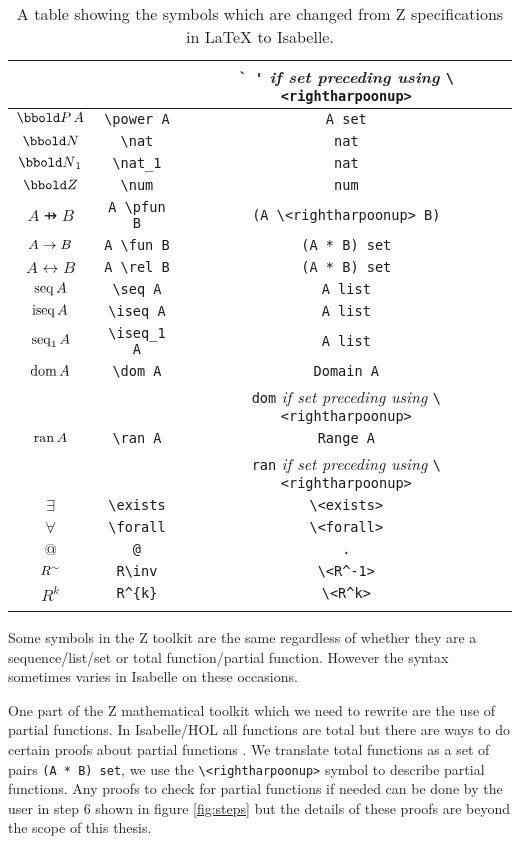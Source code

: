 {\begin{longtable}[H]{|c | c | c |}
& & \verb|` '| \textit{if set preceding using} \verb|\<rightharpoonup>| \\
\hline
$\power A$ & \verb|\power A| & \verb|A set| \\
\hline
$\nat$ & \verb|\nat| & \verb|nat| \\
\hline
$\nat_1$ & \verb|\nat_1| & \verb|nat| \\
\hline
$\num$ & \verb|\num| & \verb|num| \\
\hline
$A \pfun B$ & \verb|A \pfun B| & \verb|(A \<rightharpoonup> B)| \\
\hline
$A \rightarrow B$ & \verb|A \fun B| & \verb|(A * B) set| \\
\hline
$A \rel B$ & \verb|A \rel B| & \verb|(A * B) set| \\
\hline
$\mathop{\mathrm{seq}} A$ & \verb|\seq A| & \verb|A list| \\
\hline
$\mathop{\mathrm{iseq}} A$ & \verb|\iseq A| & \verb|A list| \\
\hline
$\mathop{\mathrm{seq}}_1 A$ & \verb|\iseq_1 A| & \verb|A list| \\
\hline
$\mathop{\mathrm{dom}} A$ & \verb|\dom A| & \verb|Domain A| \\
& & \verb|dom| \textit{if set preceding using} \verb|\<rightharpoonup>| \\
\hline
$\mathop{\mathrm{ran}} A$ & \verb|\ran A| & \verb|Range A| \\
& & \verb|ran| \textit{if set preceding using} \verb|\<rightharpoonup>| \\
\hline
$\exists$ & \verb|\exists| & \verb|\<exists>| \\
\hline
$\forall$ & \verb|\forall| & \verb|\<forall>| \\
\hline
$@$ & \verb|@| & \verb|.| \\
\hline
$R^\sim$ & \verb|R\inv| & \verb|\<R^-1>| \\
\hline
$R^{k}$ & \verb|R^{k}| & \verb|\<R^k>| \\
\hline
\caption{A table showing the symbols which are changed from Z specifications in \LaTeX{} to Isabelle.}
\label{tab:latextoisabelle}
\end{longtable}
}

Some symbols in the Z toolkit are the same regardless of whether they are a
sequence/list/set or total function/partial function. However the syntax
sometimes varies in Isabelle on these occasions.

One part of the Z mathematical toolkit which we need to rewrite are the use of
partial functions. In Isabelle/HOL all functions are total but there are ways to
do certain proofs about partial functions \cite{Krauss08definingrecursive}. We
translate total functions as a set of pairs \verb|(A * B) set|, we use the
\verb|\<rightharpoonup>| symbol to describe partial functions. Any proofs to
check for partial functions if needed can be done by the user in step 6 shown in
figure \ref{fig:steps} but the details of these proofs are beyond the scope of
this thesis.

